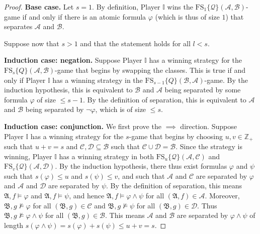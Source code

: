 \documentclass{article}
\theoremstyle{definition}
\begin{document}
\begin{proof}

    \textbf{Base case.} Let $s=1$. By definition, Player $\mathbb{I}$ wins the $\mathrm{FS}_1\{\mathcal{Q}\}(\mathcal{A},\mathcal{B})$-game if and only if there is an atomic formula $\varphi$ (which is thus of size $1$) that separates $\mathcal{A}$ and $\mathcal{B}$.

    Suppose now that $s > 1$ and that the statement holds for all $l<s$.

    \textbf{Induction case: negation.} Suppose Player $\mathbb{I}$ has a winning strategy for the $\mathrm{FS}_{s}\{Q\}(\mathcal{A},\mathcal{B})$-game that begins by swapping the classes. This is true if and only if Player $\mathbb{I}$ has a winning strategy in the $\mathrm{FS}_{s-1}\{Q\}(\mathcal{B},\mathcal{A})$-game. By the induction hypothesis, this is equivalent to $\mathcal{B}$ and $\mathcal{A}$ being separated by some formula $\varphi$ of size $\leq s-1$. By the definition of separation, this is equivalent to $\mathcal{A}$ and $\mathcal{B}$ being separated by $\neg\varphi$, which is of size $\leq s$.

    \textbf{Induction case: conjunction.} We first prove the $\implies$ direction. Suppose Player $\mathbb{I}$ has a winning strategy for the $s$-game that begins by choosing $u,v\in\mathbb{Z}_+$ such that $u+v=s$ and $\mathcal{C},\mathcal{D}\subseteq \mathcal{B}$ such that $\mathcal{C}\cup\mathcal{D}=\mathcal{B}$. Since the strategy is winning, Player $\mathbb{I}$ has a winning strategy in both $\mathrm{FS}_u\{\mathcal{Q}\}(\mathcal{A},\mathcal{C})$ and $\mathrm{FS}_v\{\mathcal{Q}\}(\mathcal{A},\mathcal{D})$. By the induction hypothesis, there thus exist formulas $\varphi$ and $\psi$ such that $s(\varphi)\leq u$ and $s(\psi)\leq v$, and such that $\mathcal{A}$ and $\mathcal{C}$ are separated by $\varphi$ and $\mathcal{A}$ and $\mathcal{D}$ are separated by $\psi$. By the definition of separation, this means $\mathfrak{A},f\models\varphi$ and $\mathfrak{A},f\models\psi$, and hence $\mathfrak{A},f\models\varphi\land\psi$ for all $(\mathfrak{A},f)\in \mathcal{A}$. Moreover, $\mathfrak{B},g\not\models\varphi$ for all $(\mathfrak{B},g)\in \mathcal{C}$ and $\mathfrak{B},g\not\models\psi$ for all $(\mathfrak{B},g)\in \mathcal{D}$. Thus $\mathfrak{B},g\not\models\varphi\land\psi$ for all $(\mathfrak{B},g)\in\mathcal{B}$. This means $\mathcal{A}$ and $\mathcal{B}$ are separated by $\varphi\land\psi$ of length $s(\varphi\land\psi)=s(\varphi)+s(\psi)\leq u+v=s$.


\end{proof}
\end{document}
